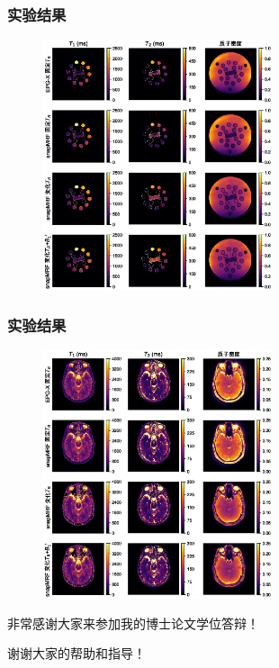 \documentclass{beamer}
\begin{document}
\begin{frame}
\frametitle{实验结果}
\begin{figure}
\centering
\includegraphics[width=0.6\textwidth]{../img/snapmrf/figure2.eps}
\end{figure}
\end{frame}

\begin{frame}
\frametitle{实验结果}
\begin{figure}
\centering
\includegraphics[width=0.6\textwidth]{../img/snapmrf/figure3.eps}
\end{figure}
\end{frame}


\begin{frame}
\centerline{非常感谢大家来参加我的博士论文学位答辩！}
\centerline{谢谢大家的帮助和指导！}
\end{frame}

\end{document}
